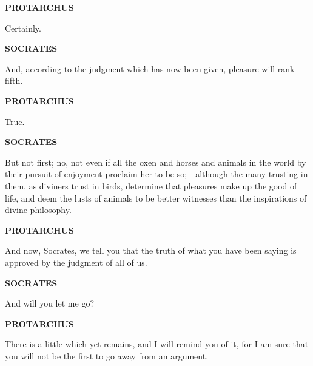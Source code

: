 \documentclass[11pt,letter]{article}
\begin{document}
\par \textbf{PROTARCHUS}
\par   Certainly.

\par \textbf{SOCRATES}
\par   And, according to the judgment which has now been given, pleasure will rank fifth.

\par \textbf{PROTARCHUS}
\par   True.

\par \textbf{SOCRATES}
\par   But not first; no, not even if all the oxen and horses and animals in the world by their pursuit of enjoyment proclaim her to be so;—although the many trusting in them, as diviners trust in birds, determine that pleasures make up the good of life, and deem the lusts of animals to be better witnesses than the inspirations of divine philosophy.

\par \textbf{PROTARCHUS}
\par   And now, Socrates, we tell you that the truth of what you have been saying is approved by the judgment of all of us.

\par \textbf{SOCRATES}
\par   And will you let me go?

\par \textbf{PROTARCHUS}
\par   There is a little which yet remains, and I will remind you of it, for I am sure that you will not be the first to go away from an argument.

\par 
 
\end{document}
